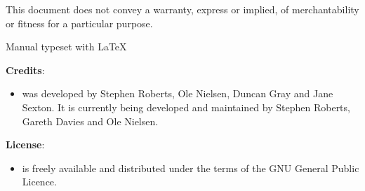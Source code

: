 This document does not convey a warranty, express or implied,
of merchantability or fitness for a particular purpose.

\begin{center}
   \anuga

   Manual typeset with \LaTeX
\end{center}

\vspace{0.5in}

\textbf{Credits}:
\begin{itemize}
\item \anuga was developed by Stephen Roberts, Ole Nielsen, Duncan Gray and Jane Sexton. It is currently being developed and
 maintained by Stephen Roberts, Gareth Davies and Ole Nielsen.
\end{itemize}

\textbf{License}:
\begin{itemize}
\item \anuga is freely available and distributed under the terms of the GNU General Public Licence.
\end{itemize}

